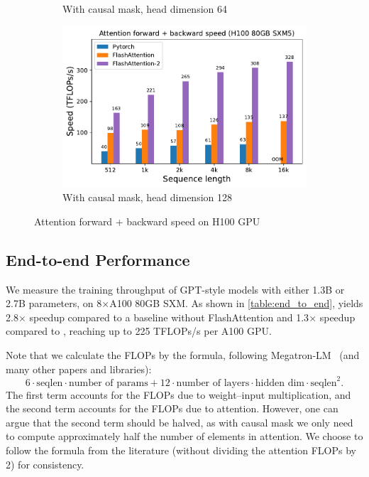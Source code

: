 \begin{figure}[ht]
\begin{subfigure}{.5\textwidth}
    \caption{With causal mask, head dimension 64}
  \end{subfigure}%
  \begin{subfigure}{.5\textwidth}
    \centering
    \includegraphics[width=.95\linewidth]{figs/flash2_h100_causal_True_hdim_128_fwd_bwd_speed.pdf}
    \caption{With causal mask, head dimension 128}
  \end{subfigure}
  \caption{Attention forward + backward speed on H100 GPU}
  \label{fig:benchmark_attn_fwd_bwd_h100}
\end{figure}

\subsection{End-to-end Performance}
\label{subsec:end_to_end}

We measure the training throughput of GPT-style models with either 1.3B or 2.7B
parameters, on 8$\times$A100 80GB SXM.
As shown in \cref{table:end_to_end}, \sysname yields 2.8$\times$ speedup compared to
a baseline without FlashAttention and 1.3$\times$ speedup compared to \sysname, reaching up to 225 TFLOPs/s
per A100 GPU.

Note that we calculate the FLOPs by the formula, following Megatron-LM~\citep{shoeybi2019megatron} (and many
other papers and libraries):
\begin{equation*}
  6 \cdot \text{seqlen} \cdot \text{number of params} + 12 \cdot \text{number of
    layers} \cdot \text{hidden dim} \cdot \text{seqlen}^2.
\end{equation*}
The first term accounts for the FLOPs due to weight--input multiplication, and
the second term accounts for the FLOPs due to attention.
However, one can argue that the second term should be halved, as with causal
mask we only need to compute approximately half the number of elements in
attention.
We choose to follow the formula from the literature (without dividing the
attention FLOPs by 2) for consistency.

